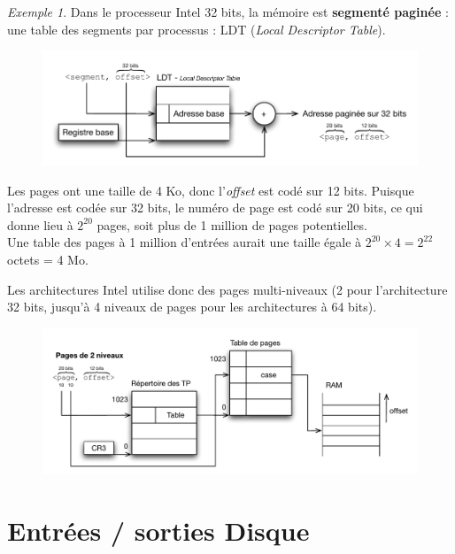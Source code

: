 \documentclass[11pt,english,french]{scrreprt}
\theoremstyle{remark}
\newtheorem*{ex*}{Exemple}
\theoremstyle{definition}
\begin{document}
\begin{ex*}
	Dans le processeur Intel 32 bits, la mémoire est \textbf{segmenté paginée} : une table des segments par processus : LDT (\emph{Local Descriptor Table}).
	
	\begin{figure}[h!]
		\center
		\vspace{-15pt}
		\includegraphics[scale=.85]{img/traduction-etapes}
		\vspace{-15pt}
	\end{figure}
		 
	Les pages ont une taille de 4 Ko, donc l'\emph{offset} est codé sur 12 bits. Puisque l'adresse est codée sur 32 bits, le numéro de page est codé sur 20 bits, ce qui donne lieu à $2^{20}$ pages, soit plus de 1 million de pages potentielles.\\
	Une table des pages à 1 million d'entrées aurait une taille égale à $2^{20}\times 4 = 2^{22}$ octets = 4 Mo.
	
	Les architectures Intel utilise donc des pages multi-niveaux (2 pour l'architecture 32 bits, jusqu'à 4 niveaux de pages pour les architectures à 64 bits).
	
	\begin{figure}[h!]
		\center
		\vspace{-15pt}
		\includegraphics[scale=.85]{img/pagination-2-niv}
		\vspace{-20pt}
	\end{figure}
   
\end{ex*}

\chapter{Entrées / sorties Disque}
\end{document}
